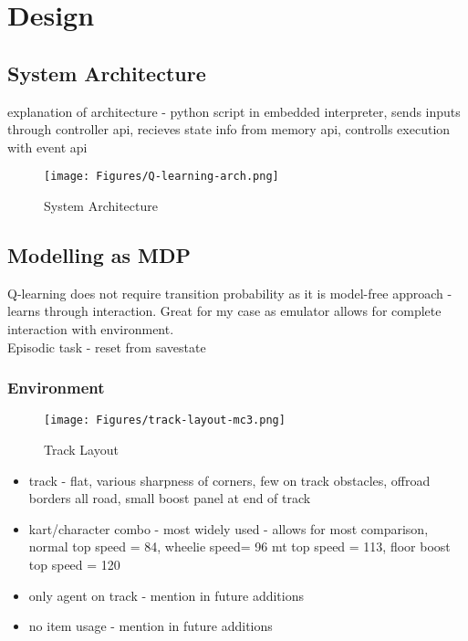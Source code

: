 \chapter{Design}
\section{System Architecture}
explanation of architecture - python script in embedded interpreter, sends inputs through controller api, recieves state info from memory api, controlls execution with event api
\begin{figure}[h]
    \centering
    \texttt{[image: Figures/Q-learning-arch.png]}
    \caption{System Architecture}
    \label{fig:q-learning-arch}
\end{figure}
\section{Modelling as MDP}
Q-learning does not require transition probability as it is model-free approach - learns through interaction. Great for my case as emulator allows for complete interaction with environment.
\\Episodic task - reset from savestate
\cite{watkins1992q}
\subsection{Environment}
\begin{figure}
    \centering
    \texttt{[image: Figures/track-layout-mc3.png]}
    \caption{Track Layout}
    \label{fig:track-layout}
\end{figure}
\begin{itemize}
    \item track - flat, various sharpness of corners, few on track obstacles, offroad borders all road, small boost panel at end of track
    \item kart/character combo - most widely used - allows for most comparison, normal top speed = 84, wheelie speed= 96 mt top speed = 113, floor boost top speed = 120
    \item only agent on track - mention in future additions
    \item no item usage - mention in future additions
\end{itemize}
